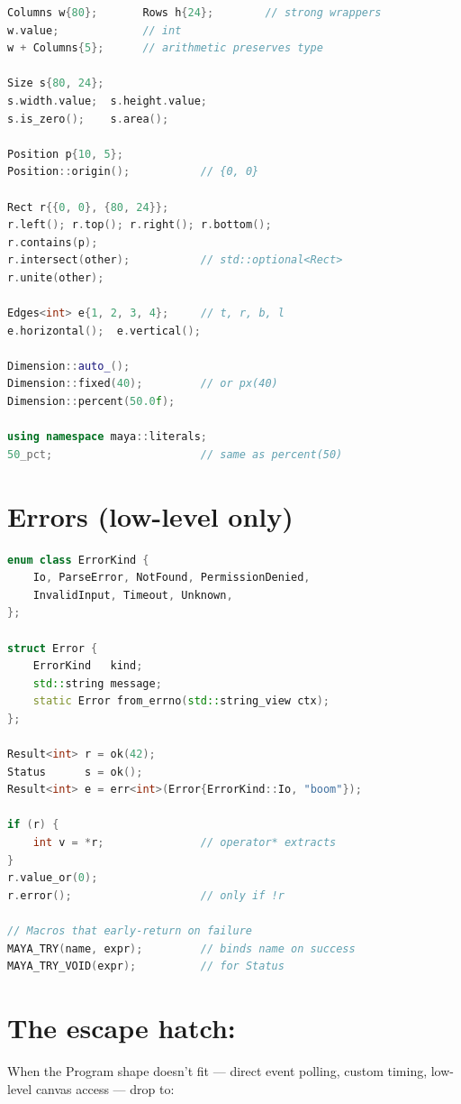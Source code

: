\begin{lstlisting}[language=C++]
Columns w{80};       Rows h{24};        // strong wrappers
w.value;             // int
w + Columns{5};      // arithmetic preserves type

Size s{80, 24};
s.width.value;  s.height.value;
s.is_zero();    s.area();

Position p{10, 5};
Position::origin();           // {0, 0}

Rect r{{0, 0}, {80, 24}};
r.left(); r.top(); r.right(); r.bottom();
r.contains(p);
r.intersect(other);           // std::optional<Rect>
r.unite(other);

Edges<int> e{1, 2, 3, 4};     // t, r, b, l
e.horizontal();  e.vertical();

Dimension::auto_();
Dimension::fixed(40);         // or px(40)
Dimension::percent(50.0f);

using namespace maya::literals;
50_pct;                       // same as percent(50)
\end{lstlisting}

\section{Errors (low-level only)}

\begin{lstlisting}[language=C++]
enum class ErrorKind {
    Io, ParseError, NotFound, PermissionDenied,
    InvalidInput, Timeout, Unknown,
};

struct Error {
    ErrorKind   kind;
    std::string message;
    static Error from_errno(std::string_view ctx);
};

Result<int> r = ok(42);
Status      s = ok();
Result<int> e = err<int>(Error{ErrorKind::Io, "boom"});

if (r) {
    int v = *r;               // operator* extracts
}
r.value_or(0);
r.error();                    // only if !r

// Macros that early-return on failure
MAYA_TRY(name, expr);         // binds name on success
MAYA_TRY_VOID(expr);          // for Status
\end{lstlisting}

\section{The escape hatch: }

When the Program shape doesn't fit — direct event polling,
custom timing, low-level canvas access — drop to:

